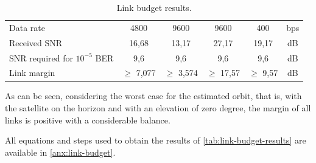 \begin{table}[!h]
\begin{tabular}{L{0.3\textwidth}ccccc}
        Data rate                       & 4800          & 9600          & 9600          & 400           & bps \\
        Received SNR                    & 16,68         & 13,17         & 27,17         & 19,17         & dB \\
        SNR required for $10^{-5}$ BER\footnotemark & 9,6           & 9,6           & 9,6           & 9,6           & dB \\
        Link margin                     & $\geq$ 7,077  & $\geq$ 3,574  & $\geq$ 17,57  & $\geq$ 9,57   & dB \\
        \bottomrule[1.5pt]
    \end{tabular}
    \caption{Link budget results.}
    \label{tab:link-budget-results}
\end{table}


As can be seen, considering the worst case for the estimated orbit, that is, with the satellite on the horizon and with an elevation of zero degree, the margin of all links is positive with a considerable balance.

All equations and steps used to obtain the results of \autoref{tab:link-budget-results} are available in \autoref{anx:link-budget}.
